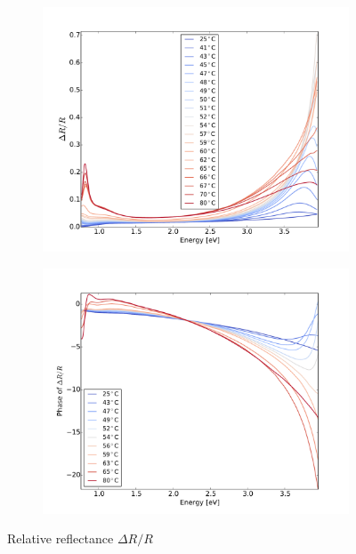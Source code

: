 \begin{figure}
    \centering
    \begin{subfigure}[b]{0.49\textwidth}
        \centering
        \includegraphics[width=\textwidth]{Results/Sim1/dR.pdf}
        \caption{}
        \label{fig:}
    \end{subfigure}
    \begin{subfigure}[b]{0.49\textwidth}
        \centering
        \includegraphics[width=\textwidth]{Results/Sim1/dRphase.pdf}
        \caption{}
        \label{fig:}
    \end{subfigure}
    \caption{Relative reflectance $\Delta R/R$}
    \label{fig:1}
\end{figure}
